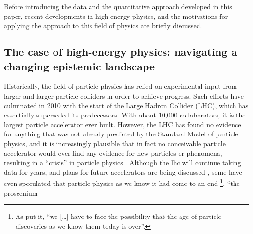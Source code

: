 \documentclass{article}
\begin{document}
Before introducing the data and the quantitative approach developed in this paper, recent developments in high-energy physics, and the motivations for applying the approach to this field of physics are briefly discussed. 




\subsection{\label{sec:hep}The case of high-energy physics: navigating a changing epistemic landscape}

Historically, the field of particle physics has relied on experimental input from larger and larger particle colliders in order to achieve progress. Such efforts have culminated in 2010 with the start of the Large Hadron Collider (LHC), which has essentially superseded its predecessors. With about  10,000 collaborators, it is the largest particle accelerator ever built. However, the LHC has found no evidence for anything that was not already predicted by the Standard Model of particle physics, and it is increasingly plausible that in fact no conceivable particle accelerator would ever find any evidence for new particles or phenomena, resulting in a ``crisis'' in particle physics \citep{susy_crisis}. Although the \gls{lhc} will continue taking data for years, and plans for future accelerators are being discussed \citep{Roser2023}, some have even speculated that particle physics as we know it had come to an end \citep{Harlander2023,Kosyakov2023}\footnote{As \citet{Harlander2023} put it, ``we [\dots] have to face the possibility that the age of particle discoveries as we know them today is over''.}, ``the proscenium
\end{document}
